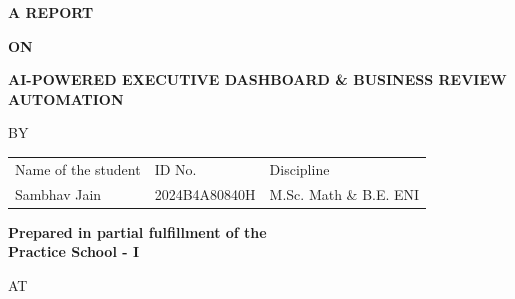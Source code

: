 \documentclass{book}
\begin{document}


\large

\thispagestyle{empty}
\centerline{\bf A REPORT}
\vspace*{0.3cm}
\centerline{\bf ON}
\vspace*{0.3cm}
\centerline{\bf AI-POWERED EXECUTIVE DASHBOARD \& BUSINESS REVIEW AUTOMATION} %
\vspace*{2cm}

\centerline{BY}
\vspace*{1cm}

\begin{center}
	\begin{tabular}{lll} %
		Name of the student & \hspace*{1cm} ID No. & \hspace*{1cm} Discipline \\ 
		Sambhav Jain &\hspace*{1cm} 2024B4A80840H &\hspace*{1cm} M.Sc. Math \& B.E. ENI \\
	\end{tabular}
\end{center}

\vspace*{2cm}
\begin{center}
	{\bf Prepared in partial fulfillment of the \\
	Practice School - I} \\ %
\end{center}

\vspace*{0.5cm}

\centerline{AT}




% 



\end{document}
